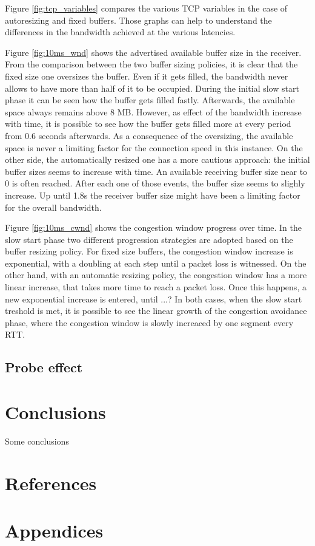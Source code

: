 \documentclass[a4paper,10pt]{article}
\begin{document}
Figure \ref{fig:tcp_variables} compares the various TCP variables in the case of autoresizing and fixed buffers. Those graphs can help to understand the differences in the bandwidth achieved at the various latencies. 

Figure \ref{fig:10ms_wnd} shows the advertised available buffer size in the receiver. From the comparison between the two buffer sizing policies, it is clear that the fixed size one oversizes the buffer. Even if it gets filled, the bandwidth never allows to have more than half of it to be occupied. During the initial slow start phase it can be seen how the buffer gets filled fastly. Afterwards, the available space always remains above 8 MB. However, as effect of the bandwidth increase with time, it is possible to see how the buffer gets filled more at every period from 0.6 seconds afterwards. As a consequence of the oversizing, the available space is never a limiting factor for the connection speed in this instance. 
On the other side, the automatically resized one has a more cautious approach: the initial buffer sizes seems to increase with time. An available receiving buffer size near to 0 is often reached. After each one of those events, the buffer size seems to slighly increase. Up until 1.8s the receiver buffer size might have been a limiting factor for the overall bandwidth. 

Figure \ref{fig:10ms_cwnd} shows the congestion window progress over time. In the slow start phase two different progression strategies are adopted based on the buffer resizing policy. For fixed size buffers, the congestion window increase is exponential, with a doubling at each step until a packet loss is witnessed. On the other hand, with an automatic resizing policy, the congestion window has a more linear increase, that takes more time to reach a packet loss. Once this happens, a new exponential increase is entered, until ...? %
In both cases, when the slow start treshold is met, it is possible to see the linear growth of the congestion avoidance phase, where the congestion window is slowly increaced by one segment every RTT.


\subsection{Probe effect}

\section{Conclusions}

Some conclusions
\newpage

\section{References}

\printbibliography

\section{Appendices}
\end{document}
